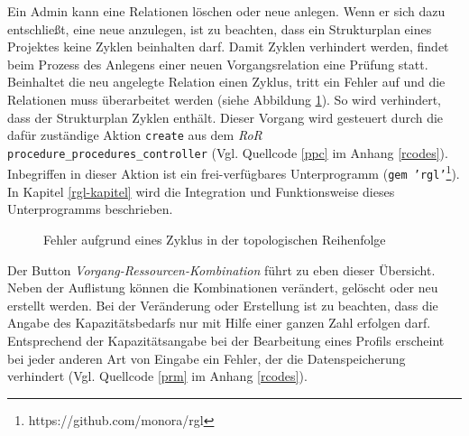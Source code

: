 \documentclass[a4paper,12pt,parskip,bibtotoc,liststotoc]{article}
\begin{document}
Ein Admin kann eine Relationen löschen oder neue anlegen. Wenn er sich dazu entschließt, eine neue anzulegen, ist zu beachten, dass ein Strukturplan eines Projektes keine Zyklen beinhalten darf. Damit Zyklen verhindert werden, findet beim Prozess des Anlegens einer neuen Vorgangsrelation eine Prüfung statt. Beinhaltet die neu angelegte Relation einen Zyklus, tritt ein Fehler auf und die Relationen muss überarbeitet werden (siehe Abbildung \ref{VorErr}). So wird verhindert, dass der Strukturplan Zyklen enthält. Dieser Vorgang wird gesteuert durch die dafür zuständige Aktion \texttt{create} aus dem \textit{RoR} \texttt{procedure\_procedures\_controller} (Vgl. Quellcode \ref{ppc} im Anhang \ref{rcodes}). Inbegriffen in dieser Aktion ist ein frei-verfügbares Unterprogramm (\texttt{gem 'rgl'}\footnote{https://github.com/monora/rgl}). In Kapitel \ref{rgl-kapitel} wird die Integration und Funktionsweise dieses Unterprogramms beschrieben. \\

\begin{figure}[h!]
  \begin{center}
    \caption{Fehler aufgrund eines Zyklus in der topologischen Reihenfolge}  \label{VorErr}
  \end{center}
\end{figure}
 
Der Button \textit{Vorgang-Ressourcen-Kombination} führt zu eben dieser Übersicht. Neben der Auflistung können die Kombinationen verändert, gelöscht oder neu erstellt werden. Bei der Veränderung oder Erstellung ist zu beachten, dass die Angabe des Kapazitätsbedarfs nur mit Hilfe einer ganzen Zahl erfolgen darf. Entsprechend der Kapazitätsangabe bei der Bearbeitung eines Profils erscheint bei jeder anderen Art von Eingabe ein Fehler, der die Datenspeicherung verhindert (Vgl. Quellcode \ref{prm} im Anhang \ref{rcodes}).\\
\end{document}
